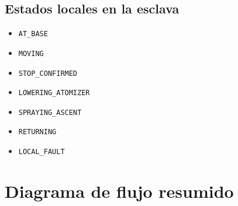 \documentclass[11pt,a4paper]{article}
\begin{document}
\subsection{Estados locales en la esclava}
\begin{itemize}
    \item \texttt{AT\_BASE}
    \item \texttt{MOVING}
    \item \texttt{STOP\_CONFIRMED}
    \item \texttt{LOWERING\_ATOMIZER}
    \item \texttt{SPRAYING\_ASCENT}
    \item \texttt{RETURNING}
    \item \texttt{LOCAL\_FAULT}
\end{itemize}

\section{Diagrama de flujo resumido}
\end{document}
